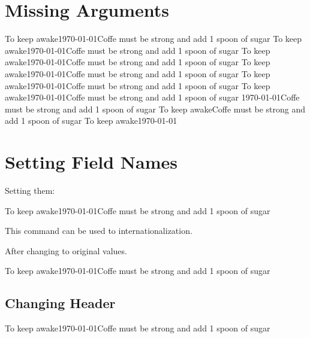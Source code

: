 \documentclass[12pt,a4paper]{article}
\begin{document}
\section{Missing Arguments}
%
{To keep awake}{\today}{Coffe must be strong and add 1 spoon of sugar}
%
{To keep awake}{\today}{Coffe must be strong and add 1 spoon of sugar}
%
{To keep awake}{\today}{Coffe must be strong and add 1 spoon of sugar}
%
{To keep awake}{\today}{Coffe must be strong and add 1 spoon of sugar}
%
{To keep awake}{\today}{Coffe must be strong and add 1 spoon of sugar}
%
{To keep awake}{\today}{Coffe must be strong and add 1 spoon of sugar}
%
{}{\today}{Coffe must be strong and add 1 spoon of sugar}
%
{To keep awake}{}{Coffe must be strong and add 1 spoon of sugar}
%
{To keep awake}{\today}{}

\section{Setting Field Names}

Setting them:

%
{To keep awake}{\today}{Coffe must be strong and add 1 spoon of sugar}

 This command can be used to internationalization.

After changing to original values.

%
{To keep awake}{\today}{Coffe must be strong and add 1 spoon of sugar}


\subsection{Changing Header}

%
{To keep awake}{\today}{Coffe must be strong and add 1 spoon of sugar}
\end{document}
